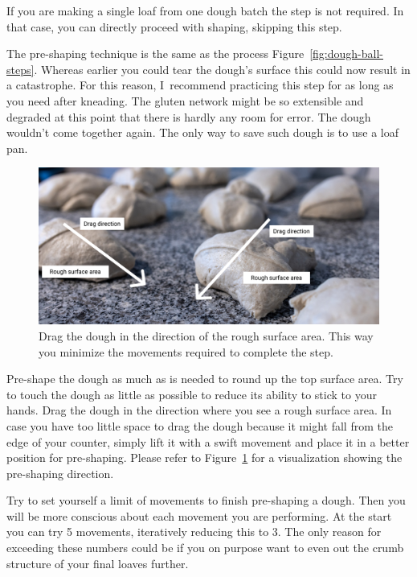 If you are making a single loaf from one dough batch the step is not required.
In that case, you can directly proceed with shaping, skipping this step.

The pre-shaping technique is the same as the process
Figure~\ref{fig:dough-ball-steps}.  Whereas earlier you could tear the dough's
surface this could now result in a catastrophe.  For this reason, I~recommend
practicing this step for as long as you need after kneading.  The gluten
network might be so extensible and degraded at this point that there is hardly
any room for error. The dough wouldn't come together again. The only way to
save such dough is to use a loaf pan.

\begin{figure}[!htb]
  \includegraphics[width=\textwidth]{preshape-direction}
  \caption[Dragging direction]{Drag the dough in the direction of the rough
      surface area. This way you minimize the movements required to complete
      the step.}%
  \label{fig:preshape-direction}
\end{figure}

Pre-shape the dough as much as is needed to round up the top surface area. Try
to touch the dough as little as possible to reduce its ability to stick to
your hands. Drag the dough in the direction where you see a rough surface
area. In case you have too little space to drag the dough because it might
fall from the edge of your counter, simply lift it with a swift movement and
place it in a better position for pre-shaping. Please refer to
Figure~\ref{fig:preshape-direction} for a visualization showing the
pre-shaping direction.

Try to set yourself a limit of movements to finish pre-shaping
a dough. Then you will be more conscious about each movement
you are performing. At the start you can try 5 movements,
iteratively reducing this to 3. The only reason for exceeding these
numbers could be if you on purpose want to even out the crumb
structure of your final loaves further.

